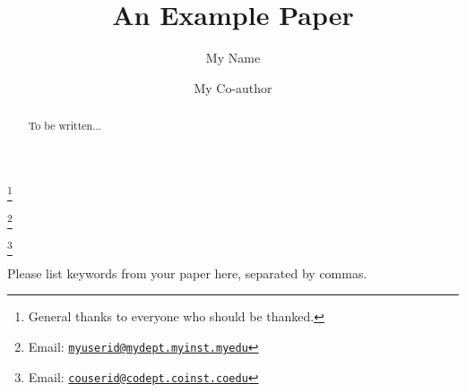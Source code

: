 \documentclass[twoside,11pt]{entics}
\begin{document}
\begin{frontmatter}
  \title{An Example Paper}
  \thanks[ALL]{General thanks to everyone who should be thanked.}
  \author{My Name}
  \author{My Co-author}
  \address[a]{My Department\\ My University\\My City, My Country}
  \thanks[myemail]%
  {Email: \href{mailto:myuserid@mydept.myinst.myedu}%
    {\texttt{\normalshape myuserid@mydept.myinst.myedu}}}
  \address[b]{My Co-author's Department\\My Co-author's University\\
    My Co-author's City, My Co-author's Country}
  \thanks[coemail]%
  {Email: \href{mailto:couserid@codept.coinst.coedu}%
    {\texttt{\normalshape couserid@codept.coinst.coedu}}}
  \begin{abstract}
    To be written...
  \end{abstract}
  \begin{keyword}
    Please list keywords from your paper here, separated by commas.
  \end{keyword}
\end{frontmatter}


% 
\end{document}
